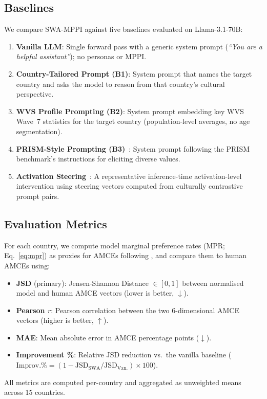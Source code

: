 \documentclass{article}
\begin{document}
\subsection{Baselines}
\label{sec:exp:baselines}

We compare SWA-MPPI against five baselines evaluated on Llama-3.1-70B:

\begin{enumerate}
  \item \textbf{Vanilla LLM}: Single forward pass with a generic system prompt
        (\emph{``You are a helpful assistant''}); no personas or MPPI.
  \item \textbf{Country-Tailored Prompt (B1)}: System prompt that names the target country
        and asks the model to reason from that country's cultural perspective.
  \item \textbf{WVS Profile Prompting (B2)}: System prompt embedding key WVS Wave~7
        statistics for the target country (population-level averages, no age segmentation).
  \item \textbf{PRISM-Style Prompting (B3)}~\citep{kirk2024prism}: System prompt following
        the PRISM benchmark's instructions for eliciting diverse values.
  \item \textbf{Activation Steering}~\citep{arditi2025refusal}: A representative inference-time
        activation-level intervention using steering vectors computed from culturally
        contrastive prompt pairs.
\end{enumerate}

\subsection{Evaluation Metrics}
\label{sec:exp:metrics}

For each country, we compute model marginal preference rates (MPR; Eq.~\ref{eq:mpr})
as proxies for AMCEs following \citet{jin2025multitp}, and compare them to
human AMCEs using:
\begin{itemize}
  \item \textbf{JSD} (primary): Jensen-Shannon Distance $\in [0,1]$ between normalised
        model and human AMCE vectors (lower is better, $\downarrow$).
  \item \textbf{Pearson $r$}: Pearson correlation between the two 6-dimensional AMCE
        vectors (higher is better, $\uparrow$).
  \item \textbf{MAE}: Mean absolute error in AMCE percentage points ($\downarrow$).
  \item \textbf{Improvement \%}: Relative JSD reduction vs.\ the vanilla baseline
        ($\text{Improv.}\% = (1 - \text{JSD}_{\text{SWA}}/\text{JSD}_{\text{Van.}})\times 100$).
\end{itemize}
All metrics are computed per-country and aggregated as unweighted means across 15 countries.
\end{document}
